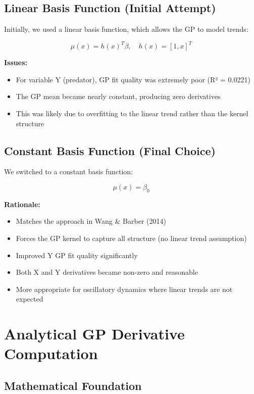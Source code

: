 \documentclass[11pt]{article}
\begin{document}
\subsection{Linear Basis Function (Initial Attempt)}

Initially, we used a linear basis function, which allows the GP to model trends:

\begin{equation}
\mu(x) = h(x)^T \beta, \quad h(x) = [1, x]^T
\end{equation}

\textbf{Issues:}
\begin{itemize}
    \item For variable Y (predator), GP fit quality was extremely poor (R² = 0.0221)
    \item The GP mean became nearly constant, producing zero derivatives
    \item This was likely due to overfitting to the linear trend rather than the kernel structure
\end{itemize}

\subsection{Constant Basis Function (Final Choice)}

We switched to a constant basis function:

\begin{equation}
\mu(x) = \beta_0
\end{equation}

\textbf{Rationale:}
\begin{itemize}
    \item Matches the approach in Wang \& Barber (2014)
    \item Forces the GP kernel to capture all structure (no linear trend assumption)
    \item Improved Y GP fit quality significantly
    \item Both X and Y derivatives became non-zero and reasonable
    \item More appropriate for oscillatory dynamics where linear trends are not expected
\end{itemize}

\section{Analytical GP Derivative Computation}

\subsection{Mathematical Foundation}
\end{document}
